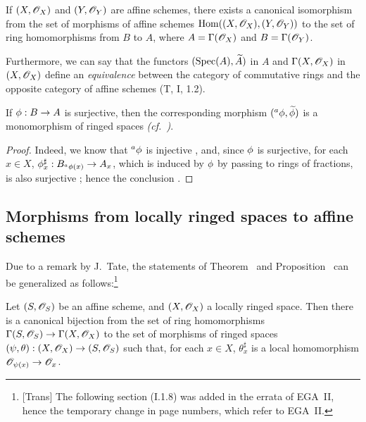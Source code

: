 \begin{cor}[1.7.4]
\label{1.1.7.4}
If $(X,\mathscr{O}_X)$ and $(Y,\mathscr{O}_Y)$ are affine schemes, there exists a canonical isomorphism from the set of morphisms of affine schemes ${\mathop{\mathrm{Hom}}\nolimits}((X,\mathscr{O}_X),(Y,\mathscr{O}_Y))$ to the set of ring homomorphisms from $B$ to $A$, where $A=\Gamma(\mathscr{O}_X)$ and $B=\Gamma(\mathscr{O}_Y)$.
\end{cor}

Furthermore, we can say that the functors $({\mathop{\mathrm{Spec}}\nolimits}(A),{\widetilde{A}})$ in $A$ and $\Gamma(X,\mathscr{O}_X)$ in $(X,\mathscr{O}_X)$ define an \emph{equivalence} between the category of commutative rings and the opposite category of affine schemes (T, I, 1.2).

\begin{cor}[1.7.5]
\label{1.1.7.5}
If $\vphi:B\to A$ is surjective, then the corresponding morphism $({}^a\phi,{\widetilde{\phi}})$ is a monomorphism of ringed spaces \emph{(cf.~)}.
\end{cor}

\begin{proof}
\label{proof-1.1.7.5}
Indeed, we know that ${}^a\phi$ is injective , and, since $\phi$ is
surjective, for each $x\in X$, $\vphi_x^\sharp:B_{{}^a\vphi(x)}\to A_x$, which is induced by $\phi$ by passing to rings of fractions, is also surjective ;
hence the conclusion .
\end{proof}

\subsection{Morphisms from locally ringed spaces to affine schemes}
\label{subsection:morphisms-lrs-to-affine-schemes}

Due to a remark by J.~Tate, the statements of Theorem~ and Proposition~ can be generalized as follows:\footnote{[Trans] The following section (I.1.8) was added in the errata of EGA~II, hence the temporary change in page numbers, which refer to EGA~II.}

\begin{prop}[1.8.1]
\label{1.1.8.1}
Let $(S,\mathscr{O}_S)$ be an affine scheme, and $(X,\mathscr{O}_X)$ a locally ringed space.
Then there is a canonical bijection from the set of ring homomorphisms
$\Gamma(S,\OO_S)\to\Gamma(X,\OO_X)$ to the set of morphisms of ringed spaces $(\psi,\theta):(X,\OO_X)\to(S,\OO_S)$ such that, for each $x\in X$, $\theta_x^\sharp$ is a local homomorphism $\OO_{\psi(x)}\to\OO_x$.
\end{prop}

